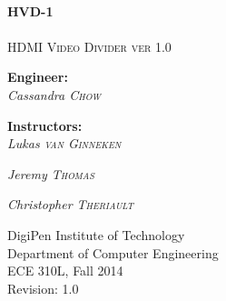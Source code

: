 \begin{titlepage}
\begin{center}

\HRule \\[0.5cm]
{\huge \bfseries HVD-1\\[0.5cm]}
\HRule \\[1.0cm]

\textsc{\LARGE HDMI Video Divider ver 1.0}\\
[1.5cm]

\begin{minipage}{0.9\textwidth}
\begin{flushleft} \large
{\bfseries Engineer:}\\
\emph{Cassandra \textsc{Chow}}
\end{flushleft}
\end{minipage}
\begin{minipage}{0.9\textwidth}
\begin{flushright} \large
{\bfseries Instructors:}\\
\emph{Lukas \textsc{van Ginneken}}

\emph{Jeremy \textsc{Thomas}}

\emph{Christopher \textsc{Theriault}}
\end{flushright}
\end{minipage}

\vfill

{\large DigiPen Institute of Technology}\\
{\large Department of Computer Engineering}\\
{\large ECE 310L, Fall 2014}\\
{\large Revision: 1.0}

\end{center}
\end{titlepage}